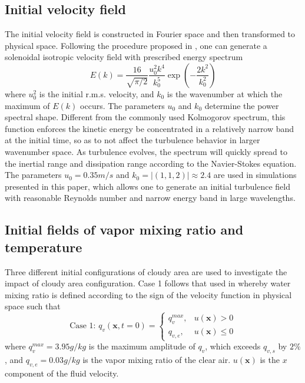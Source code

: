\documentclass[draft,linenumbers]{agujournal}
\begin{document}
\subsection{Initial velocity field}   
The initial velocity field is constructed in Fourier space and then transformed to physical space. Following the procedure proposed in \citet{Rogallo81}, one can generate a solenoidal isotropic velocity field with prescribed energy spectrum \citep{Rosales05}
\begin{equation}
E(k) = \frac{16}{\sqrt{\pi/2}}\frac{u_0^2k^4}{k_0^5}\exp(-\frac{2k^2}{k_0^2})
\end{equation}
where $u_0^2$ is the initial r.m.s. velocity, and $k_0$ is the wavenumber at which the maximum of $E(k)$ occurs. The parameters $u_0$ and $k_0$ determine the power spectral shape. Different from the commonly used Kolmogorov spectrum, this function enforces the kinetic energy be concentrated in a relatively narrow band at the initial time, so as to not affect the turbulence behavior in larger wavenumber space. As turbulence evolves, the spectrum will quickly spread to the inertial range and dissipation range according to the Navier-Stokes equation.  The parameters $u_0 = 0.35m/s$ and $k_0 = |(1,1,2)| \approx 2.4$ are used in simulations presented in this paper, which allows one to generate an initial turbulence field with reasonable Reynolds number and narrow energy band in large wavelengths.


\subsection{Initial fields of vapor mixing ratio and temperature}
Three different initial configurations of cloudy area are used to investigate the impact of cloudy area configuration. Case 1 follows that used in \citet{And04} whereby water mixing ratio is defined according to the sign of the velocity function in physical space such that
\begin{equation}
\mbox{Case 1: } q_v(\mathbf{x},t=0) = 
\left\{\begin{array}{lr}
q_v^{max}, & u(\mathbf{x}) > 0\\
q_{v,e}, & u(\mathbf{x}) \le 0
\end{array}\right.\label{case1}
\end{equation}
where $q_v^{max} = 3.95 g/kg$ is the maximum amplitude of $q_v$, which exceeds $q_{v,s}$ by $2\%$, and $q_{v,e} = 0.03g/kg$ is the vapor mixing ratio of the clear air. $u(\mathbf{x})$ is the $x$ component of the fluid velocity. 
\end{document}
